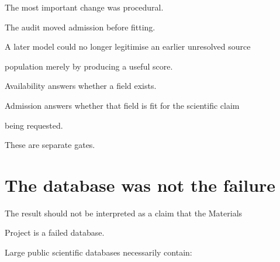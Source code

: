 \documentclass[11pt,a4paper,oneside]{report}
\begin{document}
The most important change was procedural.



The audit moved admission before fitting.



A later model could no longer legitimise an earlier unresolved source

population merely by producing a useful score.





\begin{governingrule}



Availability answers whether a field exists.



Admission answers whether that field is fit for the scientific claim

being requested.



These are separate gates.



\end{governingrule}





\section{The database was not the failure}



The result should not be interpreted as a claim that the Materials

Project is a failed database.



Large public scientific databases necessarily contain:
\end{document}
